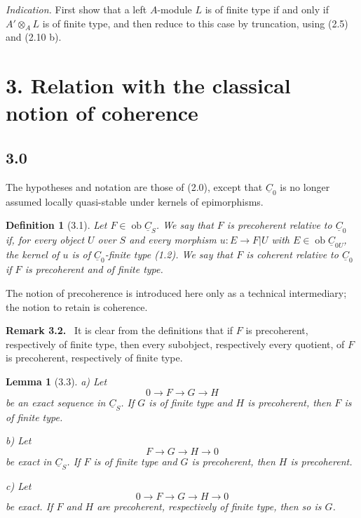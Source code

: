 \documentclass[13pt]{extarticle}
\newcommand{\uC}{\underline C}
\newcommand{\ob}{\operatorname{ob}}
\newenvironment{remarktext}[1][Remark]{\par\noindent\textbf{#1.}\ }{\par\medskip}
\newtheorem*{lemma*}{Lemma}
\newtheorem*{definition*}{Definition}
\begin{document}
\emph{Indication.} First show that a left $A$-module $L$ is of finite type if and only if $A'\otimes_A L$ is of finite type, and then reduce to this case by truncation, using (2.5) and (2.10 b).

\section*{3. Relation with the classical notion of coherence}

\subsection*{3.0}
The hypotheses and notation are those of (2.0), except that $\uC_0$ is no longer assumed locally quasi-stable under kernels of epimorphisms.

\begin{definition*}[3.1]
Let $F\in\ob\uC_S$. We say that $F$ is \emph{precoherent} relative to $\uC_0$ if, for every object $U$ over $S$ and every morphism $u:E\to F|U$ with $E\in\ob\uC_{0U}$, the kernel of $u$ is of $\uC_0$-finite type (1.2). We say that $F$ is \emph{coherent} relative to $\uC_0$ if $F$ is precoherent and of finite type.
\end{definition*}

The notion of precoherence is introduced here only as a technical intermediary; the notion to retain is coherence.

\begin{remarktext}[Remark 3.2]
It is clear from the definitions that if $F$ is precoherent, respectively of finite type, then every subobject, respectively every quotient, of $F$ is precoherent, respectively of finite type.
\end{remarktext}

\begin{lemma*}[3.3]
\textup{a)} Let
\[
0\longrightarrow F\longrightarrow G\longrightarrow H
\]
be an exact sequence in $\uC_S$. If $G$ is of finite type and $H$ is precoherent, then $F$ is of finite type.

\textup{b)} Let
\[
F\longrightarrow G\longrightarrow H\longrightarrow0
\]
be exact in $\uC_S$. If $F$ is of finite type and $G$ is precoherent, then $H$ is precoherent.

\textup{c)} Let
\[
0\longrightarrow F\longrightarrow G\longrightarrow H\longrightarrow0
\]
be exact. If $F$ and $H$ are precoherent, respectively of finite type, then so is $G$.
\end{lemma*}
\end{document}
